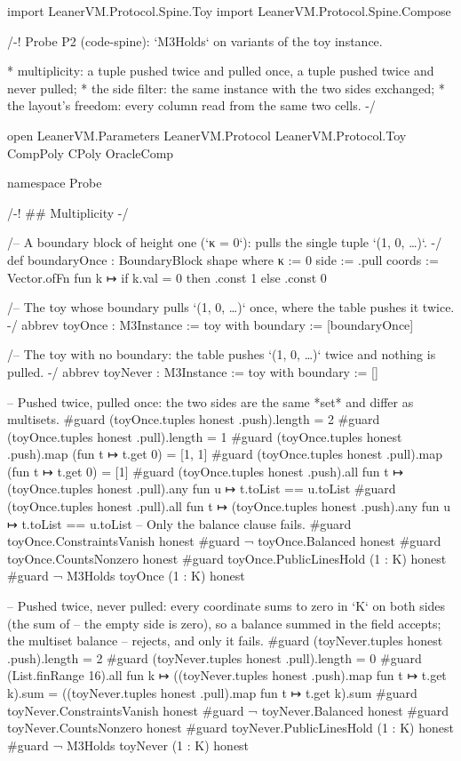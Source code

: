 
\begin{leancode}
import LeanerVM.Protocol.Spine.Toy
import LeanerVM.Protocol.Spine.Compose

/-!
Probe P2 (code-spine): `M3Holds` on variants of the toy instance.

* multiplicity: a tuple pushed twice and pulled once, a tuple pushed twice and never pulled;
* the side filter: the same instance with the two sides exchanged;
* the layout's freedom: every column read from the same two cells.
-/

open LeanerVM.Parameters LeanerVM.Protocol LeanerVM.Protocol.Toy CompPoly CPoly OracleComp

namespace Probe

/-! ## Multiplicity -/

/-- A boundary block of height one (`κ = 0`): pulls the single tuple `(1, 0, …)`. -/
def boundaryOnce : BoundaryBlock shape where
  κ := 0
  side := .pull
  coords := Vector.ofFn fun k ↦ if k.val = 0 then .const 1 else .const 0

/-- The toy whose boundary pulls `(1, 0, …)` once, where the table pushes it twice. -/
abbrev toyOnce : M3Instance := { toy with boundary := [boundaryOnce] }

/-- The toy with no boundary: the table pushes `(1, 0, …)` twice and nothing is pulled. -/
abbrev toyNever : M3Instance := { toy with boundary := [] }

-- Pushed twice, pulled once: the two sides are the same *set* and differ as multisets.
#guard (toyOnce.tuples honest .push).length = 2
#guard (toyOnce.tuples honest .pull).length = 1
#guard (toyOnce.tuples honest .push).map (fun t ↦ t.get 0) = [1, 1]
#guard (toyOnce.tuples honest .pull).map (fun t ↦ t.get 0) = [1]
#guard (toyOnce.tuples honest .push).all fun t ↦ (toyOnce.tuples honest .pull).any fun u ↦
  t.toList == u.toList
#guard (toyOnce.tuples honest .pull).all fun t ↦ (toyOnce.tuples honest .push).any fun u ↦
  t.toList == u.toList
-- Only the balance clause fails.
#guard toyOnce.ConstraintsVanish honest
#guard ¬ toyOnce.Balanced honest
#guard toyOnce.CountsNonzero honest
#guard toyOnce.PublicLinesHold (1 : K) honest
#guard ¬ M3Holds toyOnce (1 : K) honest

-- Pushed twice, never pulled: every coordinate sums to zero in `K` on both sides (the sum of
-- the empty side is zero), so a balance summed in the field accepts; the multiset balance
-- rejects, and only it fails.
#guard (toyNever.tuples honest .push).length = 2
#guard (toyNever.tuples honest .pull).length = 0
#guard (List.finRange 16).all fun k ↦
  ((toyNever.tuples honest .push).map fun t ↦ t.get k).sum =
    ((toyNever.tuples honest .pull).map fun t ↦ t.get k).sum
#guard toyNever.ConstraintsVanish honest
#guard ¬ toyNever.Balanced honest
#guard toyNever.CountsNonzero honest
#guard toyNever.PublicLinesHold (1 : K) honest
#guard ¬ M3Holds toyNever (1 : K) honest


\end{leancode}
